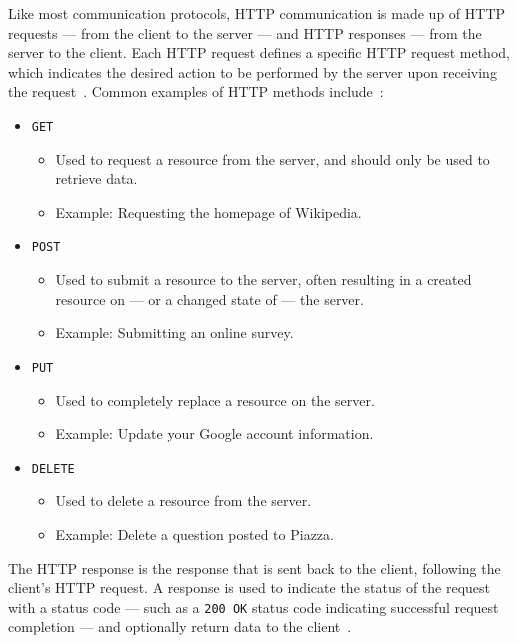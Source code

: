 \documentclass[12pt,openany,a4paper]{book}
\begin{document}
Like most communication protocols, HTTP communication is made up of HTTP requests
--- from the client to the server ---  and HTTP responses --- from the server to
the client. Each HTTP request defines a specific HTTP request method, which
indicates the desired action to be performed by the server upon receiving the
request~\cite{mdn_http_methods}. Common examples of HTTP methods
include~\cite{mdn_http_methods, shuler_2002}:
\begin{itemize}
	\item \verb|GET|
	\begin{itemize}
		\item Used to request a resource from the server, and should only be
		used to retrieve data.
		\item Example: Requesting the homepage of Wikipedia.
	\end{itemize}
	\item \verb|POST|
	\begin{itemize}
		\item Used to submit a resource to the server, often resulting in a
		created resource on --- or a changed state of --- the server.
		\item Example: Submitting an online survey.
	\end{itemize}
	\item \verb|PUT|
	\begin{itemize}
		\item Used to completely replace a resource on the server.
		\item Example: Update your Google account information.
	\end{itemize}
	\item \verb|DELETE|
	\begin{itemize}
		\item Used to delete a resource from the server.
		\item Example: Delete a question posted to Piazza.
	\end{itemize}
\end{itemize}
The HTTP response is the response that is sent back to
the client, following the client's HTTP request. A response is used to indicate
the status of the request with a status code --- such as a \verb|200 OK| status
code indicating successful request completion --- and optionally return data to
the client~\cite{shuler_2002}.

\end{document}

